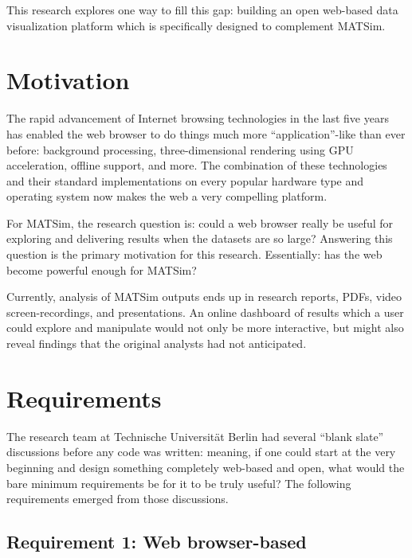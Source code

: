 This research explores one way to fill this gap: building an open web-based data visualization platform which is specifically designed to complement MATSim.

\hypertarget{mathub-motivation}{%
\section{Motivation}\label{mathub-motivation}}

The rapid advancement of Internet browsing technologies in the last five years has enabled the web browser to do things much more ``application''-like than ever before: background processing, three-dimensional rendering using GPU acceleration, offline support, and more. The combination of these technologies and their standard implementations on every popular hardware type and operating system now makes the web a very compelling platform.

For MATSim, the research question is: could a web browser really be useful for exploring and delivering results when the datasets are so large? Answering this question is the primary motivation for this research. Essentially: has the web become powerful enough for MATSim?

Currently, analysis of MATSim outputs ends up in research reports, PDFs, video screen-recordings, and presentations. An online dashboard of results which a user could explore and manipulate would not only be more interactive, but might also reveal findings that the original analysts had not anticipated.

\hypertarget{mathub-requirements}{%
\section{Requirements}\label{requirements}}

The research team at Technische Universität Berlin had several ``blank slate'' discussions before any code was written: meaning, if one could start at the very beginning and design something completely web-based and open, what would the bare minimum requirements be for it to be truly useful? The following requirements emerged from those discussions.

\hypertarget{requirement-1-web-browser-based}{%
\subsection{Requirement 1: Web browser-based}\label{requirement-1-web-browser-based}}


